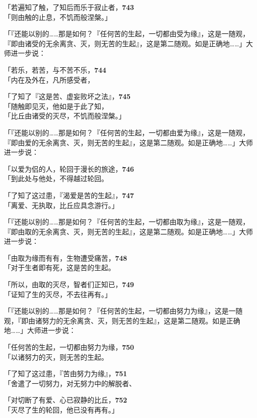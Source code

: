 「若遍知了触，了知后而乐于寂止者，\hfill{\grayfootnotesize \textbf{743}} \\
「则由触的止息，不饥而般涅槃。」


「『还能以别的……那是如何？『任何苦的生起，一切都由受为缘』，这是一随观，『即由诸受的无余离贪、灭，则无苦的生起』，这是第二随观。如是正确地……」大师进一步说：


「若乐，若苦，与不苦不乐，\hfill{\grayfootnotesize \textbf{744}} \\
「内在及外在，凡所感受者，

「了知了『这是苦、虚妄败坏之法』，\hfill{\grayfootnotesize \textbf{745}} \\
「随触即见灭，他如是于此了知，\\
「比丘由诸受的灭尽，不饥而般涅槃。」


「『还能以别的……那是如何？『任何苦的生起，一切都由爱为缘』，这是一随观，『即由爱的无余离贪、灭，则无苦的生起』，这是第二随观。如是正确地……」大师进一步说：


「以爱为侣的人，轮回于漫长的旅途，\hfill{\grayfootnotesize \textbf{746}} \\
「到此处与他处，不得越过轮回。

「了知了这过患，『渴爱是苦的生起』，\hfill{\grayfootnotesize \textbf{747}} \\
「离爱、无执取，比丘应具念游行。」


「『还能以别的……那是如何？『任何苦的生起，一切都由取为缘』，这是一随观，『即由取的无余离贪、灭，则无苦的生起』，这是第二随观。如是正确地……」大师进一步说：


「由取为缘而有有，生物遭受痛苦，\hfill{\grayfootnotesize \textbf{748}} \\
「对于生者即有死，这是苦的生起。


「所以，由取的灭尽，智者们正知已，\hfill{\grayfootnotesize \textbf{749}} \\
「证知了生的灭尽，不去往再有。」


「『还能以别的……那是如何？『任何苦的生起，一切都由努力为缘』，这是一随观，『即由诸努力的无余离贪、灭，则无苦的生起』，这是第二随观。如是正确地……」大师进一步说：


「任何苦的生起，一切都由努力为缘，\hfill{\grayfootnotesize \textbf{750}} \\
「以诸努力的灭，则无苦的生起。

「了知了这过患，『苦由努力为缘』，\hfill{\grayfootnotesize \textbf{751}} \\
「舍遣了一切努力，对无努力中的解脱者、


「对切断了有爱、心已寂静的比丘，\hfill{\grayfootnotesize \textbf{752}} \\
「灭尽了生的轮回，他已没有再有。」

